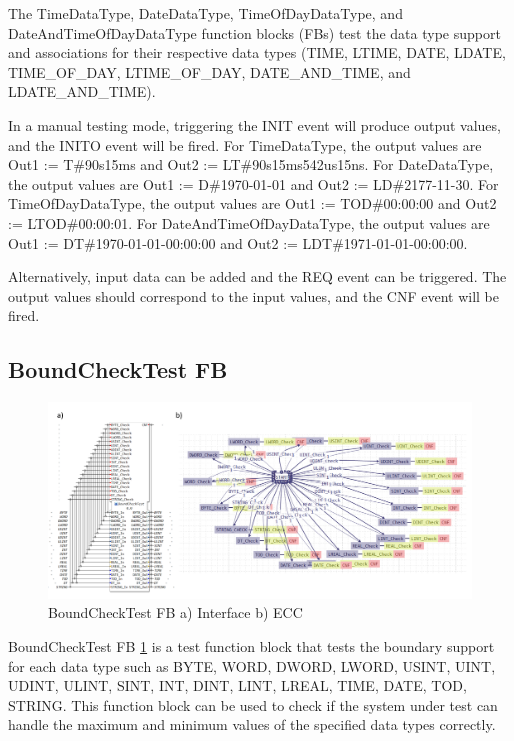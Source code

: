 \begin{bibunit}
The TimeDataType, DateDataType, TimeOfDayDataType, and DateAndTimeOfDayDataType function blocks (FBs) test the data type support and associations for their respective data types (TIME, LTIME, DATE, LDATE, TIME\_OF\_DAY, LTIME\_OF\_DAY, DATE\_AND\_TIME, and LDATE\_AND\_TIME).

In a manual testing mode, triggering the INIT event will produce output values, and the INITO event will be fired. For TimeDataType, the output values are Out1 := T\#90s15ms and Out2 := LT\#90s15ms542us15ns. For DateDataType, the output values are Out1 := D\#1970-01-01 and Out2 := LD\#2177-11-30. For TimeOfDayDataType, the output values are Out1 := TOD\#00:00:00 and Out2 := LTOD\#00:00:01. For DateAndTimeOfDayDataType, the output values are Out1 := DT\#1970-01-01-00:00:00 and Out2 := LDT\#1971-01-01-00:00:00.

Alternatively, input data can be added and the REQ event can be triggered. The output values should correspond to the input values, and the CNF event will be fired.


\subsection{BoundCheckTest FB}

\begin{figure}[!t]
	\centering
	\includegraphics[width=1\textwidth]{MX_Papers/Paper8/Figures/BCT4Diac.PNG}
	\caption{BoundCheckTest FB a) Interface b) ECC}
	\label{fig:BCT4Diac}
\end{figure}


BoundCheckTest FB \ref{fig:BCT4Diac} is a test function block that tests the boundary support for each data type such as BYTE, WORD, DWORD, LWORD, USINT, UINT, UDINT, ULINT, SINT, INT, DINT, LINT, LREAL, TIME, DATE, TOD, STRING. This function block can be used to check if the system under test can handle the maximum and minimum values of the specified data types correctly.


\end{bibunit}

